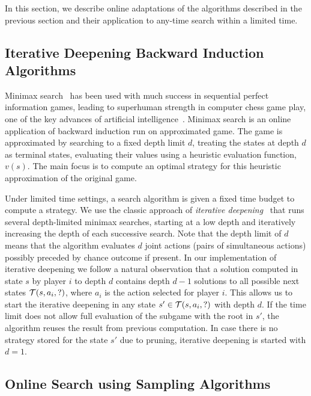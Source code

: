 In this section, we describe online adaptations of the algorithms described in the previous section and their application
to any-time search within a limited time.

\subsection{Iterative Deepening Backward Induction Algorithms} \label{sec:idbi}

Minimax search~\cite{AIbook} has been used with much success in sequential perfect information games,
leading to superhuman strength in computer chess game play, one of the key advances of artificial
intelligence~\cite{Campbell02deepblue}.
Minimax search is an online application of backward induction run on approximated game.
The game is approximated by searching to a fixed depth limit $d$, treating the states at depth $d$
as terminal states, evaluating their values using a heuristic evaluation function, $v(s)$.
The main focus is to compute an optimal strategy for this heuristic approximation of the original game.

Under limited time settings, a search algorithm is given a fixed time budget to compute a strategy.
We use the classic approach of {\it iterative deepening}~\cite{AIbook} that runs several depth-limited
minimax searches, starting at a low depth and iteratively increasing the depth of each successive search.
Note that the depth limit of $d$ means that the algorithm evaluates $d$ joint actions (\ie pairs of simultaneous actions) possibly preceded by chance outcome if present.
In our implementation of iterative deepening we follow a natural observation that a solution computed in state $s$ by player $i$ to depth $d$ contains depth $d-1$ solutions to all possible next states $\mathcal{T}(s,a_i,?)$, where $a_i$ is the action selected for player $i$.
This allows us to start the iterative deepening in any state $s' \in \mathcal{T}(s,a_i,?)$ with depth $d$.
If the time limit does not allow full evaluation of the subgame with the root in $s'$, the algorithm reuses the result from previous computation.
In case there is no strategy stored for the state $s'$ due to pruning, iterative deepening is started with $d = 1$.

\subsection{Online Search using Sampling Algorithms}

